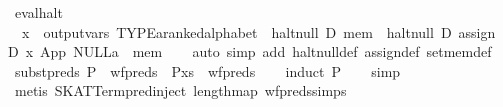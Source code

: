 \begin{isabellebody}
\isanewline
{}\isamarkupfalse%
\ eval{}halt{}\isanewline
\ \ {}x\ {}\ output{}vars\ TYPE{}{}a{}{}ranked{}alphabet{}\ {}\ halt{}null\ D\ mem\ {}\ halt{}null\ D\ {}assign\ D\ x\ {}App\ {}NULL{}{}{}a{}\ {}{}{}\ mem{}{}\isanewline
%
\isadelimproof
\ \ %
\endisadelimproof
%
\isatagproof
{}\isamarkupfalse%
\ {}auto\ simp\ add{}\ halt{}null{}def\ assign{}def\ set{}mem{}def{}%
\endisatagproof
{\isafoldproof}%
%
\isadelimproof
\isanewline
%
\endisadelimproof
\isanewline
{}\isamarkupfalse%
\ subst{}preds{}\ {}P\ {}\ wf{}preds\ {}\ P{}x{}s{}\ {}\ wf{}preds{}\isanewline
%
\isadelimproof
\ \ %
\endisadelimproof
%
\isatagproof
{}\isamarkupfalse%
\ {}induct\ P{}\isanewline
\ \ \isamarkupfalse%
\ simp\isanewline
\ \ \isamarkupfalse%
\ {}metis\ SKAT{}Term{}pred{}inject\ length{}map\ wf{}preds{}simps{}%

\end{isabellebody}
